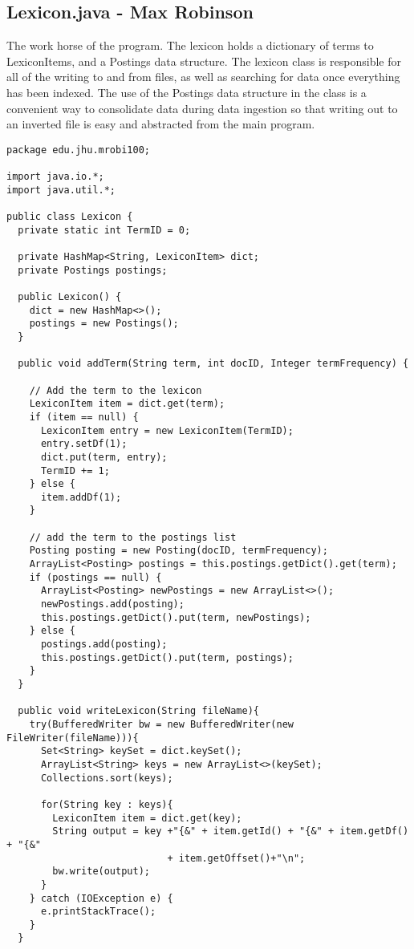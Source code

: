 \documentclass{article}
\begin{document}
\subsection{Lexicon.java - Max Robinson}
The work horse of the program. The lexicon holds a dictionary of terms to LexiconItems, and a Postings data structure. The lexicon class is responsible for all of the writing to and from files, as well as searching for data once everything has been indexed. The use of the Postings data structure in the class is a convenient way to consolidate data during data ingestion so that writing out to an inverted file is easy and abstracted from the main program. 
\begin{verbatim}
package edu.jhu.mrobi100;

import java.io.*;
import java.util.*;

public class Lexicon {
  private static int TermID = 0;

  private HashMap<String, LexiconItem> dict;
  private Postings postings;

  public Lexicon() {
    dict = new HashMap<>();
    postings = new Postings();
  }

  public void addTerm(String term, int docID, Integer termFrequency) {

    // Add the term to the lexicon
    LexiconItem item = dict.get(term);
    if (item == null) {
      LexiconItem entry = new LexiconItem(TermID);
      entry.setDf(1);
      dict.put(term, entry);
      TermID += 1;
    } else {
      item.addDf(1);
    }

    // add the term to the postings list
    Posting posting = new Posting(docID, termFrequency);
    ArrayList<Posting> postings = this.postings.getDict().get(term);
    if (postings == null) {
      ArrayList<Posting> newPostings = new ArrayList<>();
      newPostings.add(posting);
      this.postings.getDict().put(term, newPostings);
    } else {
      postings.add(posting);
      this.postings.getDict().put(term, postings);
    }
  }

  public void writeLexicon(String fileName){
    try(BufferedWriter bw = new BufferedWriter(new FileWriter(fileName))){
      Set<String> keySet = dict.keySet();
      ArrayList<String> keys = new ArrayList<>(keySet);
      Collections.sort(keys);

      for(String key : keys){
        LexiconItem item = dict.get(key);
        String output = key +"{&" + item.getId() + "{&" + item.getDf() + "{&"
                            + item.getOffset()+"\n";
        bw.write(output);
      }
    } catch (IOException e) {
      e.printStackTrace();
    }
  }


\end{verbatim}
\end{document}
